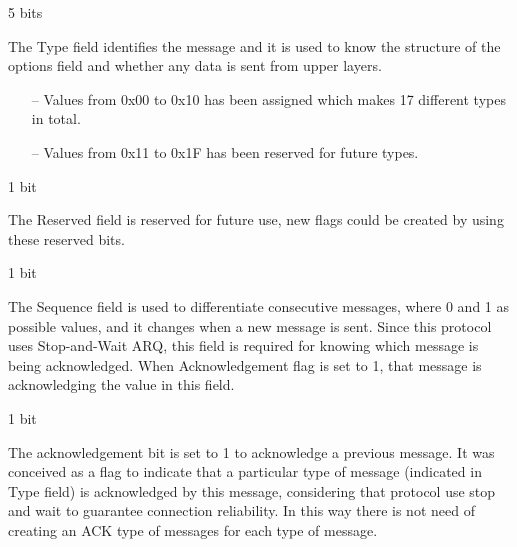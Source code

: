 \documentclass{article}
\begin{document}
\begin{description}[align=left]
    \item [Type:] 5 bits 
    \begin{flushleft}
        The Type field identifies the message and it is used to know the structure of the options field and whether any data is sent from upper layers.
        \begin{itemize}
            \item[--] Values from 0x00 to 0x10 has been assigned which makes 17 different types in total.
            \item[--] Values from 0x11 to 0x1F has been reserved for future types.
        \end{itemize}
    \end{flushleft}
    
    \item [Reserved:] 1 bit
    \begin{flushleft}
        The Reserved field is reserved for future use, new flags could be created by using these reserved bits.
    \end{flushleft}
    
    \item [Sequence:] 1 bit
    \begin{flushleft}
        The Sequence field is used to differentiate consecutive messages, where 0 and 1 as possible values, and it changes when a new message is sent. Since this protocol uses Stop-and-Wait ARQ, this field is required for knowing which message is being acknowledged. When Acknowledgement flag is set to 1, that message is acknowledging the value in this field.
    \end{flushleft}
    
     \item [Acknowledgement:] 1 bit
    \begin{flushleft}
        The acknowledgement bit is set to 1 to acknowledge a previous message. It was conceived as a flag to indicate that a particular type of message (indicated in Type field) is acknowledged by this message, considering that protocol use stop and wait to guarantee connection reliability. In this way there is not need of creating an ACK type of messages for each type of message.
    \end{flushleft}
    

\end{description}
\end{document}
